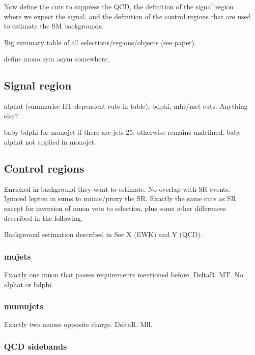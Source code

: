 Now define the cuts to suppress the QCD, the definition of the signal region 
where we expect the signal, and the definition of the control regions that are 
used to estimate the SM backgrounds.

Big summary table of all selections/regions/objects (see paper).

define mono sym asym somewhere.

\subsection{Signal region}

alphat (summarise HT-dependent cuts in table), bdphi, mht/met cuts.
Anything else?

baby bdphi for monojet if there are jets 25, otherwise remains undefined. baby 
alphat not applied in monojet.

\subsection{Control regions}

Enriched in background they want to estimate. No overlap with SR events. 
Ignored lepton in sums to mimic/proxy the SR. Exactly the same cuts as SR 
except for inversion of muon veto to selection, plus some other differences 
described in the following.

Background estimation described in Sec X (EWK) and Y (QCD).

\subsubsection{mujets}

Exactly one muon that passes requirements mentioned before. DeltaR. MT. No 
alphat or bdphi.

\subsubsection{mumujets}

Exactly two muons opposite charge. DeltaR. Mll.


\subsubsection{QCD sidebands} %

